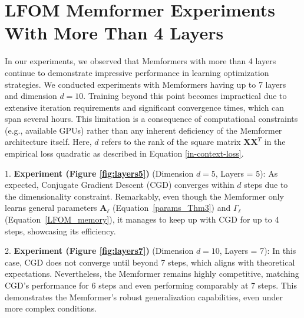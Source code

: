 \documentclass[11pt]{article}
\theoremstyle{plain}
\theoremstyle{definition}
\theoremstyle{remark}
\numberwithin{equation}{section}
\begin{document}
\section{LFOM Memformer Experiments With More Than 4 Layers}

In our experiments, we observed that Memformers with more than 4 layers continue to demonstrate impressive performance in learning optimization strategies. We conducted experiments with Memformers having up to 7 layers and dimension \( d = 10 \). Training beyond this point becomes impractical due to extensive iteration requirements and significant convergence times, which can span several hours. This limitation is a consequence of computational constraints (e.g., available GPUs) rather than any inherent deficiency of the Memformer architecture itself. Here, \( d \) refers to the rank of the square matrix \( \mathbf{X} \mathbf{X}^T \) in the empirical loss quadratic as described in Equation \ref{in-context-loss}.

1. \textbf{Experiment (Figure \ref{fig:layers5})} (Dimension \( d = 5 \), Layers = 5): As expected, Conjugate Gradient Descent (CGD) converges within \( d \) steps due to the dimensionality constraint. Remarkably, even though the Memformer only learns general parameters \( \mathbf{A}_\ell \) (Equation~\eqref{params_Thm3}) and \( \Gamma_\ell \) (Equation~\eqref{LFOM_memory}), it manages to keep up with CGD for up to 4 steps, showcasing its efficiency.

2. \textbf{Experiment (Figure \ref{fig:layers7})} (Dimension \( d = 10 \), Layers = 7): In this case, CGD does not converge until beyond 7 steps, which aligns with theoretical expectations. Nevertheless, the Memformer remains highly competitive, matching CGD's performance for 6 steps and even performing comparably at 7 steps. This demonstrates the Memformer’s robust generalization capabilities, even under more complex conditions.
\end{document}
